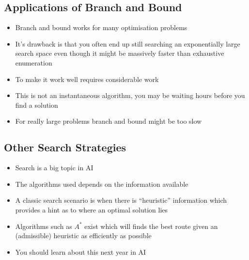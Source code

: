 \begin{slide}
\section{Applications of Branch and Bound}

\begin{PauseHighLight}
  \begin{itemize}
  \item Branch and bound works for many optimisation problems\pause
  \item It's drawback is that you often end up still searching an
    exponentially large search space even though it might be massively
    faster than exhaustive enumeration\pause
  \item To make it work well requires considerable work\pause
  \item This is not an instantaneous algorithm, you may be waiting hours
    before you find a solution\pause
  \item For really large problems branch and bound might be too
    slow\pause
  \end{itemize}
\end{PauseHighLight}

\end{slide}

\Outline %

\begin{slide}
\section{Other Search Strategies}

\begin{PauseHighLight}
  \begin{itemize}
  \item Search is a big topic in AI\pause
  \item The algorithms used depends on the information available\pause
  \item A classic search scenario is when there is ``heuristic''
    information which provides a hint as to where an optimal solution
    lies\pause
  \item Algorithms such as $A^*$ exist which will finds the best route
    given an (admissible) heuristic as efficiently as possible\pause
  \item You should learn about this next year in AI\pause
  \end{itemize}
\end{PauseHighLight}

\end{slide}

